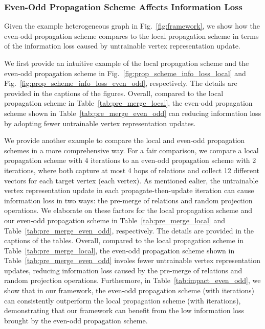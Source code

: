 \documentclass[lettersize,journal]{IEEEtran}
\begin{document}
\subsubsection{Even-Odd Propagation Scheme Affects Information Loss}\label{sec:assign_pre_merge}
Given the example heterogeneous graph in Fig.~\ref{fig:framework}, we show how the even-odd propagation scheme compares to the local propagation scheme in terms of the information loss caused by untrainable vertex representation update.

We first provide an intuitive example of the local propagation scheme and the even-odd propagation scheme in Fig.~\ref{fig:prop_scheme_info_loss_local} and Fig.~\ref{fig:prop_scheme_info_loss_even_odd}, respectively.
The details are provided in the captions of the figures.
Overall, compared to the local propagation scheme in Table~\ref{tab:pre_merge_local}, the even-odd propagation scheme shown in Table~\ref{tab:pre_merge_even_odd} can reducing information loss by adopting fewer untrainable vertex representation updates.


We provide another example to compare the local and even-odd propagation schemes in a more comprehensive way.
For a fair comparison, we compare a local propagation scheme with 4 iterations to an even-odd propagation scheme with 2 iterations, where both capture at most 4 hops of relations and collect 12 different vectors for each target vertex (each  vertex).
As mentioned ealier, the untrainable vertex representation update in each propagate-then-update iteration can cause information loss in two ways: the pre-merge of relations and random projection operations.
We elaborate on these factors for the local propagation scheme and our even-odd propagation scheme in Table~\ref{tab:pre_merge_local} and Table~\ref{tab:pre_merge_even_odd}, respectively.
The details are provided in the captions of the tables.
Overall, compared to the local propagation scheme in Table~\ref{tab:pre_merge_local}, the even-odd propagation scheme shown in Table~\ref{tab:pre_merge_even_odd} involes fewer untrainable vertex representation updates, reducing information loss caused by the pre-merge of relations and random projection operations. 
Furthermore, in Table~\ref{tab:impact_even_odd}, we show that in our framework, the even-odd propagation scheme (with  iterations) can consistently outperform the local propagation scheme (with  iterations), demonstrating that our framework can benefit from the low information loss brought by the even-odd propagation scheme.
\end{document}
